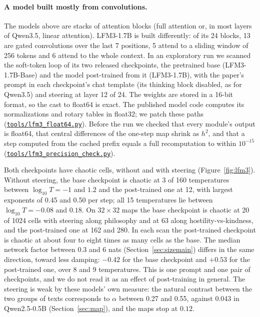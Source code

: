 \documentclass[11pt,letterpaper]{article}
\newcommand{\repourl}{https://github.com/tdj28/neural-shrimp}
\newcommand{\laterrepo}[1]{\href{\repourl/blob/0399fee2e9537a50993482aea8ec417e70286ac4/#1}{\nolinkurl{#1}}}
\begin{document}
\paragraph{A model built mostly from convolutions.} The models above are stacks of attention blocks (full attention
or, in most layers of Qwen3.5, linear attention). LFM3-1.7B \cite{liquidai2026lfm3} is built differently: of its 24
blocks, 13 are gated convolutions over the last 7 positions, 5 attend to a sliding window of 256 tokens and 6 attend
to the whole context. In an exploratory run we
scanned the soft-token loop of its two released checkpoints, the pretrained base (LFM3-1.7B-Base) and the model
post-trained from it (LFM3-1.7B), with the paper's prompt in each checkpoint's chat template (its thinking block
disabled, as for Qwen3.5) and steering at layer 12 of 24. The weights are stored in a 16-bit format, so the cast to
float64 is exact. The published model code computes its normalizations and rotary tables in float32; we patch these
paths (\laterrepo{tools/lfm3_float64.py}). Before the run we checked that every module's output is float64, that
central differences of the one-step map shrink as $h^2$, and that a step computed from the cached prefix equals a full
recomputation to within $10^{-15}$ (\laterrepo{tools/lfm3_precision_check.py}).

Both checkpoints have chaotic cells, without and with steering (Figure~\ref{fig:lfm3}). Without steering, the base
checkpoint is chaotic at 3 of 160 temperatures between $\log_{10}T=-1$ and $1.2$ and the post-trained one at 12, with
largest exponents of 0.45 and 0.50 per step; all 15 temperatures lie between $\log_{10}T=-0.08$ and $0.18$. On
$32\times32$ maps the base checkpoint is chaotic at 20 of 1024 cells with steering along philosophy and at 63 along
hostility-vs-kindness, and the post-trained one at 162 and 280. In each scan the post-trained checkpoint is chaotic
at about four to eight times as many cells as the base. The median network factor between 0.3 and 6 nats
(Section~\ref{sec:sizemain}) differs in the same direction, toward less damping: $-0.42$ for the base checkpoint
and $+0.53$ for the post-trained one, over 8 and 9 temperatures. This is one
prompt and one pair of checkpoints, and we do not read it as an effect of post-training in general. The steering
is weak by these models' own measure: the natural contrast between the two groups of texts corresponds to $\alpha$
between 0.27 and 0.55, against 0.043 in Qwen2.5-0.5B (Section~\ref{sec:map}), and the maps stop at $0.12$.
\end{document}
